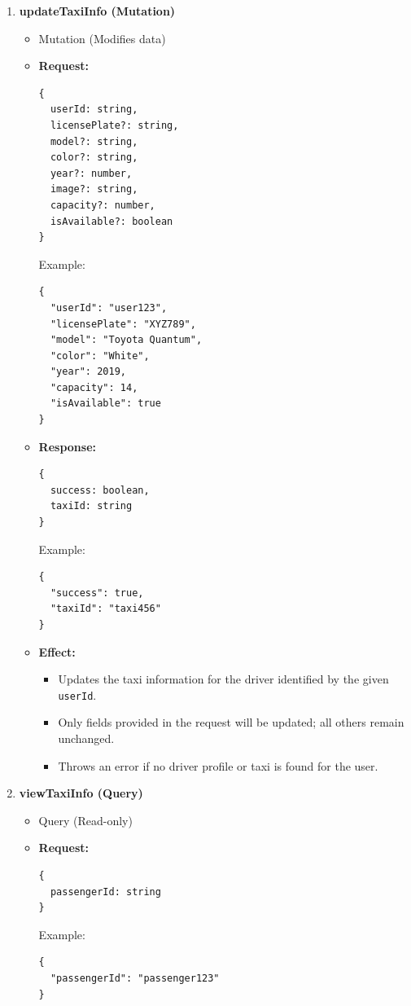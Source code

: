 \documentclass[a4paper,12pt]{article}
\begin{document}
\begin{enumerate}
\item \textbf{updateTaxiInfo (Mutation)}
    \begin{itemize}
      \item Mutation (Modifies data)
      \item \textbf{Request:}
      \begin{verbatim}
{
  userId: string,
  licensePlate?: string,
  model?: string,
  color?: string,
  year?: number,
  image?: string,
  capacity?: number,
  isAvailable?: boolean
}
      \end{verbatim}
      Example:
      \begin{verbatim}
{
  "userId": "user123",
  "licensePlate": "XYZ789",
  "model": "Toyota Quantum",
  "color": "White",
  "year": 2019,
  "capacity": 14,
  "isAvailable": true
}
      \end{verbatim}

      \item \textbf{Response:}
      \begin{verbatim}
{
  success: boolean,
  taxiId: string
}
      \end{verbatim}
      Example:
      \begin{verbatim}
{
  "success": true,
  "taxiId": "taxi456"
}
      \end{verbatim}

      \item \textbf{Effect:}
      \begin{itemize}
        \item Updates the taxi information for the driver identified by the given \texttt{userId}.
        \item Only fields provided in the request will be updated; all others remain unchanged.
        \item Throws an error if no driver profile or taxi is found for the user.
      \end{itemize}
    \end{itemize}

\item \textbf{viewTaxiInfo (Query)}
    \begin{itemize}
      \item Query (Read-only)
      \item \textbf{Request:}
      \begin{verbatim}
{
  passengerId: string
}
      \end{verbatim}
      Example:
      \begin{verbatim}
{
  "passengerId": "passenger123"
}
      \end{verbatim}


\end{itemize}
\end{enumerate}
\end{document}
